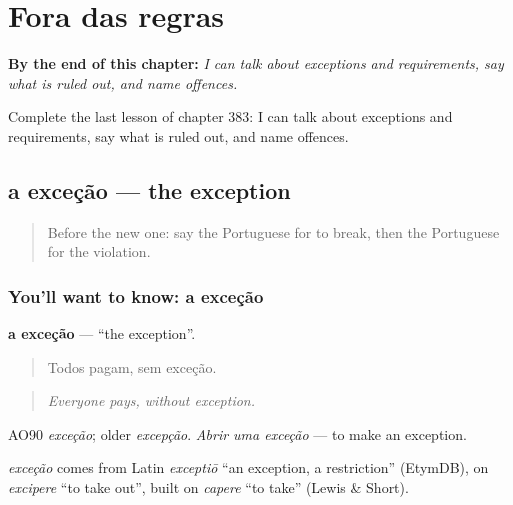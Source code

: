 
\chapter{Fora das regras}
\label{ch:pt-fora-das-regras}

\begin{chapteropening}
\textbf{By the end of this chapter:} \emph{I can talk about exceptions and requirements, say what is ruled out, and name offences.}

Complete the last lesson of chapter 383: I can talk about exceptions and requirements, say what is ruled out, and name offences.
\end{chapteropening}

\section[a exceção]{a exceção — the exception}

\label{lesson:PT-C383-excecao}



\begin{quote}
Before the new one: say the Portuguese for to break, then the Portuguese for the violation.
\end{quote}

\subsection*{You'll want to know: a exceção}
\textbf{a exceção} — \textquotedblleft{}the exception\textquotedblright{}.

\begin{quote}
Todos pagam, sem exceção.
\end{quote}

\begin{quote}
\emph{Everyone pays, without exception.}
\end{quote}

AO90 \emph{exceção}; older \emph{excepção}. \emph{Abrir uma exceção} — to make an exception.

\begin{cousinweb}
\emph{exceção} comes from Latin \emph{exceptiō} \textquotedblleft{}an exception, a restriction\textquotedblright{} (EtymDB), on \emph{excipere} \textquotedblleft{}to take out\textquotedblright{}, built on \emph{capere} \textquotedblleft{}to take\textquotedblright{} (Lewis \& Short).
\end{cousinweb}


